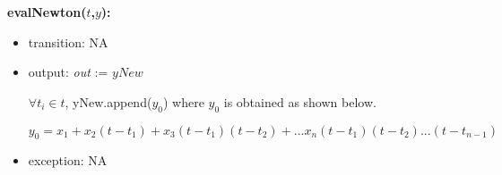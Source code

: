 \documentclass[12pt, titlepage]{article}
\begin{document}
\noindent \textbf{evalNewton($t$,$y$):}
\begin{itemize}
	\item transition: NA
	
	\item output:  \textit{out} := $yNew$
	
	$\forall t_i \in t$, yNew.append($y_0$) where $y_0$ is obtained as shown 
	below.
	
	\begin{equation*}
	y_0 = x_1 + x_2(t-t_1) + x_3(t-t_1)(t-t_2) + ... 
	x_n(t-t_1)(t-t_2)...(t-t_{n-1})
	\end{equation*}

	\item exception: NA
\end{itemize}
\end{document}
